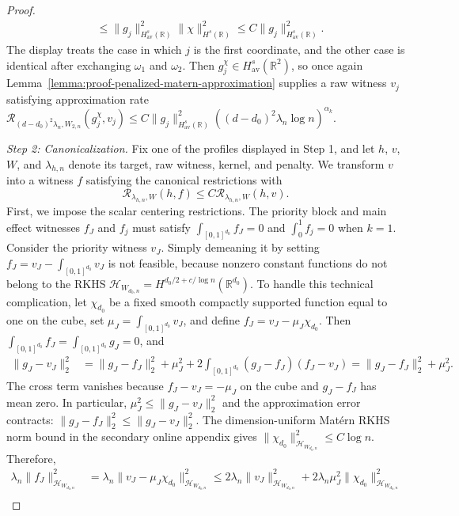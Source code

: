 \documentclass[letterpaper,12pt]{article}
\theoremstyle{definition}
\numberwithin{equation}{section}
\newcommand{\mr}{\mathbb{R}}
\newcommand{\mc}{\mathcal}
\newcommand{\norm}[1]{\lVert#1\rVert}
\begin{document}
\begin{proof}
\begin{align*}
&\leq\norm{g_j}_{H_{\mathrm{av}}^s(\mr)}^2\norm{\chi}_{H^s(\mr)}^2\leq C\norm{g_j}_{H_{\mathrm{av}}^s(\mr)}^2.
\end{align*}
The display treats the case in which $j$ is the first coordinate, and the other case is identical after exchanging $\omega_1$ and $\omega_2$.
Then $g_j^\chi\in H_{\mathrm{av}}^s(\mr^2)$, so once again Lemma~\ref{lemma:proof-penalized-matern-approximation} supplies a raw witness $v_j$ satisfying approximation rate $\mathcal R_{(d-d_0)^2\lambda_n,W_{2,n}}(g_j^\chi,v_j)\leq C\norm{g_j}_{H_{\mathrm{av}}^s(\mr)}^2((d-d_0)^2\lambda_n\log n)^{\alpha_k}$.

\medskip

\emph{Step 2: Canonicalization.}
Fix one of the profiles displayed in Step 1, and let $h$, $v$, $W$, and $\lambda_{h,n}$ denote its target, raw witness, kernel, and penalty.
We transform $v$ into a witness $f$ satisfying the canonical restrictions with 
\begin{equation*}
\mathcal R_{\lambda_{h,n},W}(h,f)\leq C\mathcal R_{\lambda_{h,n},W}(h,v).
\end{equation*}
First, we impose the scalar centering restrictions.
The priority block and main effect witnesses $f_J$ and $f_j$ must satisfy $\int_{[0,1]^{d_0}}f_J=0$ and $\int_0^1f_j=0$ when $k=1$.
Consider the priority witness $v_J$.
Simply demeaning it by setting $f_J = v_J-\int_{[0,1]^{d_0}}v_J$ is not feasible, because nonzero constant functions do not belong to the RKHS $\mc H_{W_{d_0,n}}=H^{d_0/2+c/\log n}(\mr^{d_0})$.
To handle this technical complication, let $\chi_{d_0}$ be a fixed smooth compactly supported function equal to one on the cube, set $\mu_J=\int_{[0,1]^{d_0}}v_J$, and define $f_J=v_J-\mu_J\chi_{d_0}$.
Then $\int_{[0,1]^{d_0}}f_J=\int_{[0,1]^{d_0}}g_J=0$, and
\begin{align*}
\norm{g_J-v_J}_2^2&=\norm{g_J-f_J}_2^2+\mu_J^2+2\int_{[0,1]^{d_0}}(g_J-f_J)(f_J-v_J) =\norm{g_J-f_J}_2^2+\mu_J^2.
\end{align*}
The cross term vanishes because $f_J-v_J=-\mu_J$ on the cube and $g_J-f_J$ has mean zero.
In particular, $\mu_J^2\leq\norm{g_J-v_J}_2^2$ and the approximation error contracts: $\norm{g_J-f_J}_2^2\leq\norm{g_J-v_J}_2^2$.
The dimension-uniform Mat\'ern RKHS norm bound in the secondary online appendix gives $\norm{\chi_{d_0}}_{\mc H_{W_{d_0,n}}}^2\leq C\log n$.
Therefore,
\begin{align*}
\lambda_n\norm{f_J}_{\mc H_{W_{d_0,n}}}^2&=\lambda_n\norm{v_J-\mu_J\chi_{d_0}}_{\mc H_{W_{d_0,n}}}^2\leq2\lambda_n\norm{v_J}_{\mc H_{W_{d_0,n}}}^2+2\lambda_n\mu_J^2\norm{\chi_{d_0}}_{\mc H_{W_{d_0,n}}}^2\\

\end{align*}
\end{proof}
\end{document}

